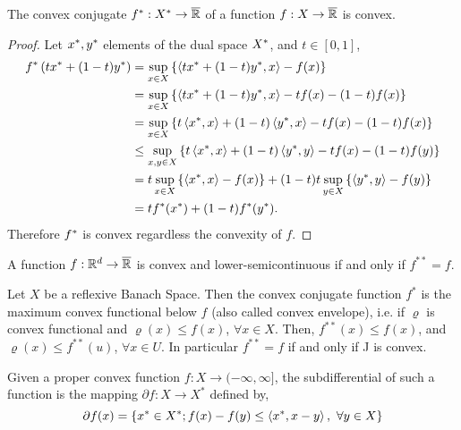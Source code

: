 \begin{proposition}
	The convex conjugate ${f}^*:{X}^*\rightarrow \overline{\mathbb{R}}$ of a function $f:X\rightarrow\overline{\mathbb{R}}$ is convex.
	\begin{proof}
		Let ${x}^*, {y}^*$ elements of the dual space ${X}^*$, and $t\in[0,1]$,
		\begin{align*}
			{f}^*\left( t{x}^*+(1-t){y}^* \right)&=\sup_{x\in X}\left\lbrace \left\langle t{x}^*+(1-t){y}^*, x \right\rangle-f(x) \right\rbrace \\
			&=\sup_{x\in X}\left\lbrace \left\langle t{x}^*+(1-t){y}^*, x \right\rangle-tf(x)-(1-t)f(x) \right\rbrace\\
			&=\sup_{x\in X}\left\lbrace t\left\langle {x}^*, x \right\rangle+(1-t)\left\langle {y}^*, x \right\rangle-tf(x)-(1-t)f(x) \right\rbrace\\
			&\leq \sup_{x, y \in X} \left\lbrace t\left\langle {x}^*, x \right\rangle+(1-t)\left\langle {y}^*, y \right\rangle-tf(x)-(1-t)f(y) \right\rbrace\\
			&=t\sup_{x \in X} \left\lbrace \left\langle {x}^*, x \right\rangle-f(x) \right\rbrace+(1-t)t\sup_{y \in X} \left\lbrace \left\langle {y}^*, y \right\rangle-f(y) \right\rbrace\\
			&=t{f}^*({x}^*)+(1-t){f}^*({y}^*).
		\end{align*}
		Therefore ${f}^*$ is convex regardless the convexity of $f$.
	\end{proof}
\end{proposition}

\begin{theorem} 
	A function $f:\mathbb{R}^d \rightarrow \overline{\mathbb{R}}$ is convex and lower-semicontinuous if and only if $f^{**}=f$.
\end{theorem}
	
\begin{lemma}
	Let $X$ be a reflexive Banach Space. Then the convex conjugate function $f^*$ is the maximum convex functional below $f$ (also called convex envelope), i.e. if $\varrho$ is convex functional and $\varrho(x)\leq f(x)$, $\forall x \in X$. Then, $f^{**}(x)\leq f(x)$, and $\varrho(x)\leq f^{**}(u)$, $\forall x \in U $. In particular $f^{**} = f$ if and only if J is convex.
\end{lemma}


\begin{definition}[Subdifferential]
	Given a proper convex function $f: X\rightarrow (-\infty, \infty]$, the subdifferential of such a function is the mapping $\partial f: X\rightarrow X^*$ defined by,
	\begin{equation*}
		\partial f (x)= \left\lbrace x^*\in X^*; f(x)-f(y) \leq \left\langle x^*, x-y \right\rangle,\ \forall y \in X \right\rbrace
	\end{equation*}
\end{definition}

